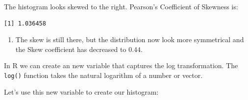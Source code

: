 \documentclass[
  letterpaper,
  DIV=11,
  numbers=noendperiod]{scrreprt}
\newenvironment{Shaded}{\begin{snugshade}}{\end{snugshade}}
\newcommand{\DecValTok}[1]{\textcolor[rgb]{0.68,0.00,0.00}{#1}}
\newcommand{\FunctionTok}[1]{\textcolor[rgb]{0.28,0.35,0.67}{#1}}
\newcommand{\NormalTok}[1]{\textcolor[rgb]{0.00,0.23,0.31}{#1}}
\newcommand{\OtherTok}[1]{\textcolor[rgb]{0.00,0.23,0.31}{#1}}
\newcommand{\SpecialCharTok}[1]{\textcolor[rgb]{0.37,0.37,0.37}{#1}}
\providecommand{\tightlist}{%
  \setlength{\itemsep}{0pt}\setlength{\parskip}{0pt}}\usepackage{longtable,booktabs,array}
\begin{document}
The histogram looks skewed to the right. Pearson's Coefficient of
Skewness is:

\begin{Shaded}
\end{Shaded}

\begin{verbatim}
[1] 1.036458
\end{verbatim}

\begin{blackbox}

\begin{enumerate}
\def\labelenumi{\arabic{enumi}.}
\setcounter{enumi}{2}
\tightlist
\item
  The skew is still there, but the distribution now look more
  symmetrical and the Skew coefficient has decreased to \(0.44\).
\end{enumerate}

\end{blackbox}

In R we can create an new variable that captures the log transformation.
The \texttt{log()} function takes the natural logarithm of a number or
vector.

\begin{Shaded}
\end{Shaded}

Let's use this new variable to create our histogram:
\end{document}
